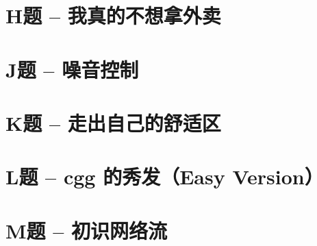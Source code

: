 \documentclass{ctexart}
\begin{document}
\section{H题 -- 我真的不想拿外卖}


\section{J题 -- 噪音控制}


\section{K题 -- 走出自己的舒适区}


\section{L题 -- cgg 的秀发（Easy Version）}


\section{M题 -- 初识网络流}

\end{document}

